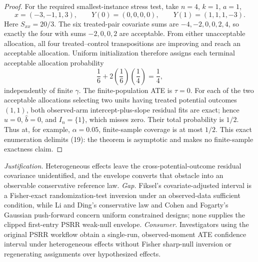 \documentclass{article}
\begin{document}
\begin{proof}
For the required smallest-instance stress test, take \(n=4\), \(k=1\), \(a=1\),
\[
 x=(-3,-1,1,3),\qquad Y(0)=(0,0,0,0),\qquad
 Y(1)=(1,1,1,-3).
\]
Here \(S_{xx}=20/3\).  The six treated-pair covariate sums are \(-4,-2,0,0,2,4\), so exactly the four with sums \(-2,0,0,2\) are acceptable.  From either unacceptable allocation, all four treated--control transpositions are improving and reach an acceptable allocation.  Uniform initialization therefore assigns each terminal acceptable allocation probability
\[
 \frac16+2\left(\frac16\right)\left(\frac14\right)=\frac14,
\]
independently of finite \(\gamma\).  The finite-population ATE is \(\tau=0\).  For each of the two acceptable allocations selecting two units having treated potential outcomes \((1,1)\), both observed-arm intercept-plus-slope residual fits are exact; hence \(\widehat u=0\), \(\widehat b=0\), and \(I_n=\{1\}\), which misses zero.  Their total probability is \(1/2\).  Thus at, for example, \(\alpha=0.05\), finite-sample coverage is at most \(1/2\).  This exact enumeration delimits (19): the theorem is asymptotic and makes no finite-sample exactness claim.
\end{proof}
\par\smallskip\noindent \textit{Justification.} Heterogeneous effects leave the cross-potential-outcome residual covariance unidentified, and the envelope converts that obstacle into an observable conservative reference law. \textit{Gap.} Fiksel's covariate-adjusted interval is a Fisher-exact randomization-test inversion under an observed-data sufficient condition, while Li and Ding's conservative law and Cohen and Fogarty's Gaussian push-forward concern uniform constrained designs; none supplies the clipped first-entry PSRR weak-null envelope. \textit{Consumer.} Investigators using the original PSRR workflow obtain a single-run, observed-moment ATE confidence interval under heterogeneous effects without Fisher sharp-null inversion or regenerating assignments over hypothesized effects.
\end{document}
